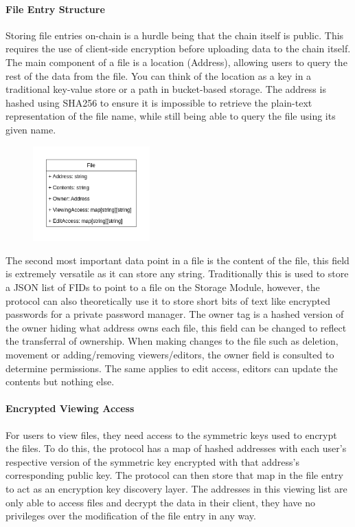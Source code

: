 \documentclass[a4paper]{article}
\begin{document}
\paragraph{File Entry Structure}
Storing file entries on-chain is a hurdle being that the chain itself is public. This requires the use of client-side encryption before uploading data to the chain itself. The main component of a file is a location (Address), allowing users to query the rest of the data from the file. You can think of the location as a key in a traditional key-value store or a path in bucket-based storage. The address is hashed using SHA256 to ensure it is impossible to retrieve the plain-text representation of the file name, while still being able to query the file using its given name. 

\begin{figure}[!htbp]
\centering
\includegraphics[width=0.4\textwidth]{assets/filetree2.png}
\caption{}
\end{figure}

\newpage
The second most important data point in a file is the content of the file, this field is extremely versatile as it can store any string. Traditionally this is used to store a JSON list of FIDs to point to a file on the Storage Module, however, the protocol can also theoretically use it to store short bits of text like encrypted passwords for a private password manager. The owner tag is a hashed version of the owner hiding what address owns each file, this field can be changed to reflect the transferral of ownership. When making changes to the file such as deletion, movement or adding/removing viewers/editors, the owner field is consulted to determine permissions. The same applies to edit access, editors can update the contents but nothing else. 

\paragraph{Encrypted Viewing Access}
For users to view files, they need access to the symmetric keys used to encrypt the files. To do this, the protocol has a map of hashed addresses with each user's respective version of the symmetric key encrypted with that address's corresponding public key. The protocol can then store that map in the file entry to act as an encryption key discovery layer. The addresses in this viewing list are only able to access files and decrypt the data in their client, they have no privileges over the modification of the file entry in any way.
\end{document}
